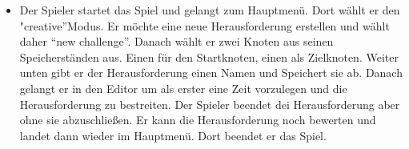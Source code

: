 \begin{itemize}
\item Der Spieler startet das Spiel und gelangt zum Hauptmenü. Dort wählt er den "{}creative\textquotedblright Modus. Er möchte eine neue Herausforderung erstellen und wählt daher \textquotedblleft{}new challenge\textquotedblright. Danach wählt er zwei Knoten aus seinen Speicherständen aus. Einen für den Startknoten, einen als Zielknoten. Weiter unten gibt er der Herausforderung einen Namen und Speichert sie ab. Danach gelangt er in den Editor um als erster eine Zeit vorzulegen und die Herausforderung zu bestreiten. Der Spieler beendet dei Herausforderung aber ohne sie abzuschließen. Er kann die Herausforderung noch bewerten und landet dann wieder im Hauptmenü. Dort beendet er das Spiel.
\end{itemize}


%
%	
%	
%	
%


%
%




